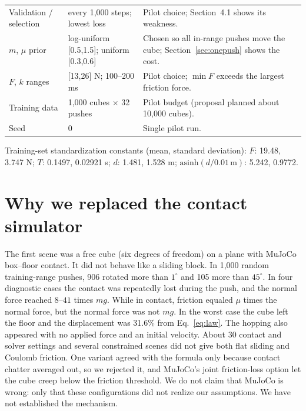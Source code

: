 \documentclass{article}
\begin{document}
\begin{table}[ht]
\begin{tabular}{>{\raggedright}p{3.2cm}>{\raggedright}p{3.0cm}p{6.4cm}}
Validation / selection & every 1,000 steps; lowest loss & Pilot choice; Section~4.1 shows its weakness.\\
$m$, $\mu$ prior & log-uniform [0.5,1.5]; uniform [0.3,0.6] & Chosen so all in-range pushes move the cube; Section~\ref{sec:onepush} shows the cost.\\
$F$, $k$ ranges & [13,26] N; 100--200 ms & Pilot choice; $\min F$ exceeds the largest friction force.\\
Training data & 1,000 cubes $\times$ 32 pushes & Pilot budget (proposal planned about 10,000 cubes).\\
Seed & 0 & Single pilot run.\\
\bottomrule
\end{tabular}
\end{table}

Training-set standardization constants (mean, standard deviation): $F$: 19.48, 3.747 N; $T$: 0.1497, 0.02921 s; $d$: 1.481, 1.528 m; $\mathrm{asinh}(d/0.01\,\mathrm m)$: 5.242, 0.9772.

\section{Why we replaced the contact simulator}\label{app:contact}
The first scene was a free cube (six degrees of freedom) on a plane with MuJoCo box--floor contact. It did not behave like a sliding block. In 1,000 random training-range pushes, 906 rotated more than $1^\circ$ and 105 more than $45^\circ$. In four diagnostic cases the contact was repeatedly lost during the push, and the normal force reached $8$--$41$ times $mg$. While in contact, friction equaled $\mu$ times the normal force, but the normal force was not $mg$. In the worst case the cube left the floor and the displacement was 31.6\% from Eq.~\eqref{eq:law}. The hopping also appeared with no applied force and an initial velocity. About 30 contact and solver settings and several constrained scenes did not give both flat sliding and Coulomb friction. One variant agreed with the formula only because contact chatter averaged out, so we rejected it, and MuJoCo's joint friction-loss option let the cube creep below the friction threshold. We do not claim that MuJoCo is wrong: only that these configurations did not realize our assumptions. We have not established the mechanism.
\end{document}
